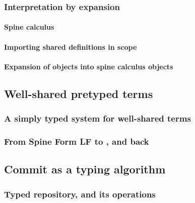\documentclass[preprint,9pt,authoryear]{sigplanconf}
\begin{document}



\subsubsection{Interpretation by expansion}

\paragraph{Spine calculus}


\paragraph{Importing shared definitions in scope}


\paragraph{Expansion of {\system} objects into spine calculus objects}



\subsection{Well-shared pretyped terms}



\subsubsection{A simply typed system for well-shared terms}

\subsubsection{From Spine Form LF to {\system}, and back}

\subsection{Commit as a typing algorithm}

\subsubsection{Typed repository, and its operations}
\end{document}
